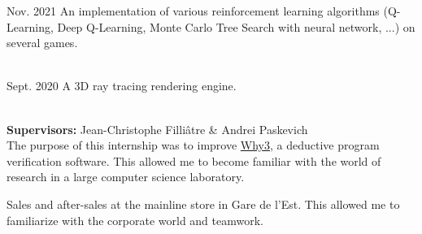 \documentclass[10pt,a4paper,ragged2e,withhyper]{altacv}
\begin{document}
\begin{paracol}{2}
            {Nov. 2021}{}
            An implementation of various reinforcement learning algorithms
            (Q-Learning, Deep Q-Learning, Monte Carlo Tree Search with neural network, ...)
            on several games.\\
            \vspace{4pt}
            \\
            \vspace{4pt}
            \divider
            
            {Sept. 2020}{}
            A 3D ray tracing rendering engine.\\
            \vspace{4pt}
            \\
            \vspace{4pt}

            \textbf{Supervisors:} Jean-Christophe Filliâtre \& Andrei Paskevich\\
            \vspace{3pt}
            The purpose of this internship was to improve \href{http://why3.lri.fr/}{Why3}, a deductive program verification software.
            This allowed me to become familiar with the world of research in a large computer science laboratory.

            \divider

            Sales and after-sales at the mainline store in Gare de l'Est. This allowed me to familiarize with the corporate world and teamwork.
        
    \end{paracol}
\end{document}

